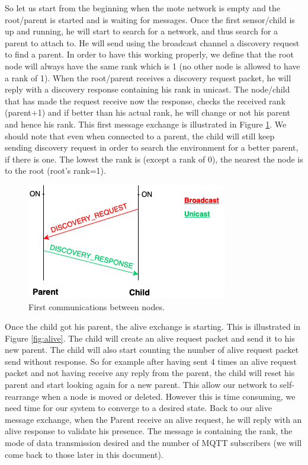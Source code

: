 \documentclass[a4paper,10pt]{article}
\begin{document}
So let us start from the beginning when the mote network is empty and the root/parent is started and is waiting for messages. Once the first sensor/child is up and running, he will start to search for a network, and thus search for a parent to attach to. He will send using the broadcast channel a discovery request to find a parent. In order to have this working properly, we define that the root node will always have the same rank which is 1 (no other node is allowed to have a rank of 1). When the root/parent receives a discovery request packet, he will reply with a discovery response containing his rank in unicast. The node/child that has made the request receive now the response, checks the received rank (parent+1) and if better than his actual rank, he will change or not his parent and hence his rank. This first message exchange is illustrated in Figure \ref{fig:bd}. We should note that even when connected to a parent, the child will still keep sending discovery request in order to search the environment for a better parent, if there is one. The lowest the rank is (except a rank of 0), the nearest the node is to the root (root's rank=1).\\

\begin{figure}
\centering
\includegraphics[scale=0.6]{./img/discovery.png}
\caption{First communications between nodes.}
\label{fig:bd}
\end{figure}

Once the child got his parent, the alive exchange is starting. This is illustrated in Figure \ref{fig:alive}. The child will create an alive request packet and send it to his new parent. The child will also start counting the number of alive request packet send without response. So for example after having sent 4 times an alive request packet and not having receive any reply from the parent, the child will reset his parent and start looking again for a new parent. This allow our network to self-rearrange when a node is moved or deleted. However this is time consuming, we need time for our system to converge to a desired state. Back to our alive message exchange, when the Parent receive an alive request, he will reply with an alive response to validate his presence. The message is containing the rank, the mode of data transmission desired and the number of MQTT subscribers (we will come back to those later in this document).\\
\end{document}
